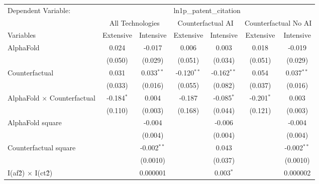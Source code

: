 \begingroup
\centering
\begin{tabular}{lcccccc}
   \tabularnewline \midrule \midrule
   Dependent Variable: & \multicolumn{6}{c}{ln1p\_patent\_citation}\\
 & \multicolumn{2}{c}{All Technologies} & \multicolumn{2}{c}{Counterfactual AI} & \multicolumn{2}{c}{Counterfactual No AI} \\
\cmidrule(lr){1-1}\cmidrule(lr){2-3} \cmidrule(lr){4-5} \cmidrule(lr){6-7}
Variables & \multicolumn{1}{c}{Extensive} & \multicolumn{1}{c}{Intensive} & \multicolumn{1}{c}{Extensive} & \multicolumn{1}{c}{Intensive} & \multicolumn{1}{c}{Extensive} & \multicolumn{1}{c}{Intensive} \\
\cmidrule(lr){1-1}\cmidrule(lr){2-2} \cmidrule(lr){3-3} \cmidrule(lr){4-4} \cmidrule(lr){5-5} \cmidrule(lr){6-6} \cmidrule(lr){7-7}
   AlphaFold                          & 0.024        & -0.017        & 0.006         & 0.003         & 0.018        & -0.019\\   
                                      & (0.050)      & (0.029)       & (0.051)       & (0.034)       & (0.051)      & (0.029)\\   
   Counterfactual                     & 0.031        & 0.033$^{**}$  & -0.120$^{**}$ & -0.162$^{**}$ & 0.054        & 0.037$^{**}$\\   
                                      & (0.033)      & (0.016)       & (0.055)       & (0.082)       & (0.037)      & (0.016)\\   
   AlphaFold $\times$ Counterfactual  & -0.184$^{*}$ & 0.004         & -0.187        & -0.085$^{*}$  & -0.201$^{*}$ & 0.003\\   
                                      & (0.110)      & (0.003)       & (0.168)       & (0.044)       & (0.121)      & (0.003)\\   
   AlphaFold square                   &              & -0.004        &               & -0.006        &              & -0.004\\   
                                      &              & (0.004)       &               & (0.004)       &              & (0.004)\\   
   Counterfactual square              &              & -0.002$^{**}$ &               & 0.043         &              & -0.002$^{**}$\\   
                                      &              & (0.0010)      &               & (0.037)       &              & (0.0010)\\   
   I(af\^2) $\times$ I(ct\^2)         &              & 0.000001      &               & 0.003$^{*}$   &              & 0.000002\\   

\end{tabular}
